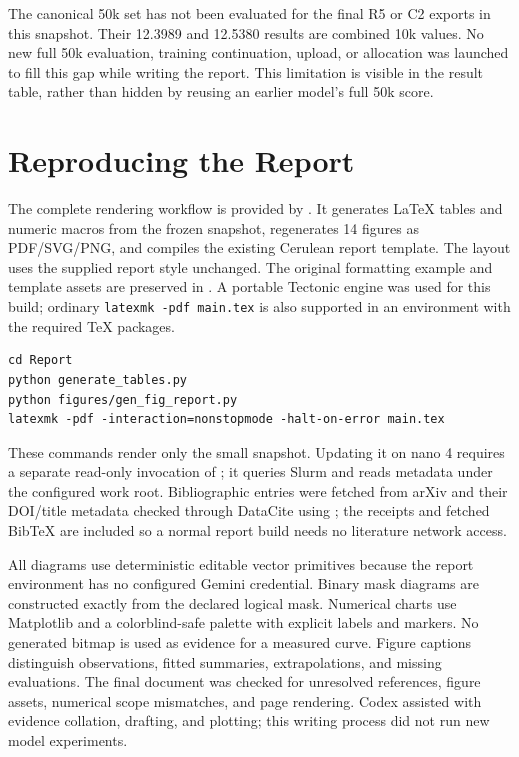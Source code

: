 The canonical 50k set has not been evaluated for the final R5 or C2 exports in this snapshot. Their 12.3989 and 12.5380 results are combined 10k values. No new full 50k evaluation, training continuation, upload, or allocation was launched to fill this gap while writing the report. This limitation is visible in the result table, rather than hidden by reusing an earlier model's full 50k score.

\section{Reproducing the Report}
\label{app:reproduce}

The complete rendering workflow is provided by . It generates LaTeX tables and numeric macros from the frozen snapshot, regenerates 14 figures as PDF/SVG/PNG, and compiles the existing Cerulean report template. The layout uses the supplied report style unchanged. The original formatting example and template assets are preserved in . A portable Tectonic engine was used for this build; ordinary \texttt{latexmk -pdf main.tex} is also supported in an environment with the required TeX packages.

\begin{verbatim}
cd Report
python generate_tables.py
python figures/gen_fig_report.py
latexmk -pdf -interaction=nonstopmode -halt-on-error main.tex
\end{verbatim}

These commands render only the small snapshot. Updating it on nano 4 requires a separate read-only invocation of ; it queries Slurm and reads metadata under the configured work root. Bibliographic entries were fetched from arXiv and their DOI/title metadata checked through DataCite using ; the receipts and fetched BibTeX are included so a normal report build needs no literature network access.

All diagrams use deterministic editable vector primitives because the report environment has no configured Gemini credential. Binary mask diagrams are constructed exactly from the declared logical mask. Numerical charts use Matplotlib and a colorblind-safe palette with explicit labels and markers. No generated bitmap is used as evidence for a measured curve. Figure captions distinguish observations, fitted summaries, extrapolations, and missing evaluations. The final document was checked for unresolved references, figure assets, numerical scope mismatches, and page rendering. Codex assisted with evidence collation, drafting, and plotting; this writing process did not run new model experiments.
